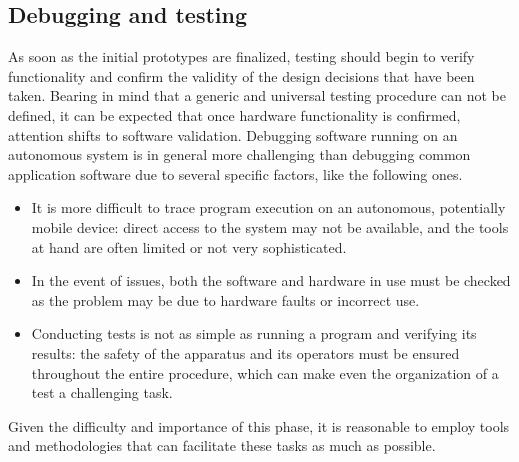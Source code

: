\subsection{Debugging and testing}
\label{sec:design_challenges_testing}
As soon as the initial prototypes are finalized, testing should begin to verify functionality and confirm the validity of the design decisions that have been taken. Bearing in mind that a generic and universal testing procedure can not be defined, it can be expected that once hardware functionality is confirmed, attention shifts to software validation. Debugging software running on an autonomous system is in general more challenging than debugging common application software due to several specific factors, like the following ones.
\begin{itemize}
  \item It is more difficult to trace program execution on an autonomous, potentially mobile device: direct access to the system may not be available, and the tools at hand are often limited or not very sophisticated.
  \item In the event of issues, both the software and hardware in use must be checked as the problem may be due to hardware faults or incorrect use.
  \item Conducting tests is not as simple as running a program and verifying its results: the safety of the apparatus and its operators must be ensured throughout the entire procedure, which can make even the organization of a test a challenging task.
\end{itemize}

Given the difficulty and importance of this phase, it is reasonable to employ tools and methodologies that can facilitate these tasks as much as possible.
